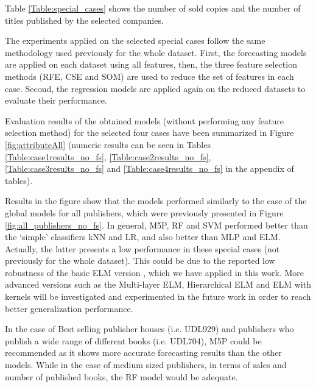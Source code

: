 \documentclass[a4paper,10pt,twocolumn,preprint,3p]{elsarticle}
\begin{document}
Table \ref{Table:special_cases} shows the number of sold copies and the number 
of titles published by the selected companies.



The experiments applied on the selected special cases follow the same methodology used previously for the whole dataset. First, the forecasting models are applied on each dataset using all features, then, the three feature selection methods (RFE, CSE and SOM) are used to reduce the set of features in each case. Second, the regression models are applied again on the reduced datasets to evaluate their performance.

Evaluation results of the obtained models (without performing any feature selection method) for the selected four cases have been summarized in Figure \ref{fig:attributeAll} 
(numeric results can be seen in Tables 
\ref{Table:case1results_no_fs}, \ref{Table:case2results_no_fs}, 
\ref{Table:case3results_no_fs} and \ref{Table:case4results_no_fs} 
in the appendix of tables).

Results in the figure show that the models performed similarly to the case of 
the global models for all publishers, which were previously presented in 
Figure \ref{fig:all_publishers_no_fs}. 
In general, M5P, RF and SVM performed better than the `simple' classifiers kNN and LR, and also better than MLP and ELM. Actually, the latter presents a low performance in these special cases (not previously for the whole dataset).
This could be due to the reported low robustness of the basic ELM version \cite{ding2015deep}, which we have applied in this work. More advanced versions such as the Multi-layer ELM, Hierarchical ELM and ELM with kernels will be investigated and experimented in the future work in order to reach better generalization performance.

In the case of Best selling publisher houses (i.e. UDL929) and publishers who 
publish a wide range of different books (i.e. UDL704), M5P could be recommended 
as it shows more accurate forecasting results than the other models. 
While in the case of medium sized publishers, in terms of sales and number 
of published books, the RF model would be adequate.


\end{document}

